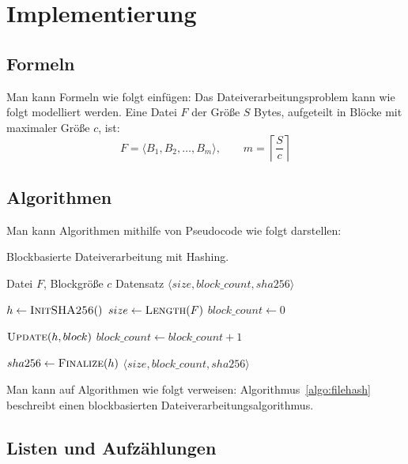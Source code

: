 \chapter{Implementierung}
\label{chap:implementation}

\section{Formeln}

Man kann Formeln wie folgt einfügen: Das Dateiverarbeitungsproblem kann wie folgt modelliert werden. Eine Datei $F$ der Größe $S$ Bytes, aufgeteilt in Blöcke mit maximaler Größe $c$, ist:
\[ F = \langle B_1, B_2, \ldots, B_m \rangle, \qquad m = \left\lceil \frac{S}{c} \right\rceil \]

\section{Algorithmen}

Man kann Algorithmen mithilfe von Pseudocode wie folgt darstellen:

\begin{algorithm}[htbp]
    \caption{Blockbasierte Dateiverarbeitung mit Hashing.}
    \label{algo:filehash}
    \begin{algorithmic}[1]
        \Require Datei $F$, Blockgröße $c$
        \Ensure Datensatz $\langle size, block\_count, sha256 \rangle$

        \State $h \gets \textsc{InitSHA256}()$ 
        \State $size \gets \textsc{Length}(F)$
        \State $block\_count \gets 0$
        \Statex

            \State $\textsc{Update}(h, block)$
            \State $block\_count \gets block\_count + 1$
        \EndFor
        \Statex

        \State $sha256 \gets \textsc{Finalize}(h)$
        \State \Return $\langle size, block\_count, sha256 \rangle$
    \end{algorithmic}
\end{algorithm}

Man kann auf Algorithmen wie folgt verweisen: Algorithmus~\ref{algo:filehash} beschreibt einen blockbasierten Dateiverarbeitungsalgorithmus.

\section{Listen und Aufzählungen}

